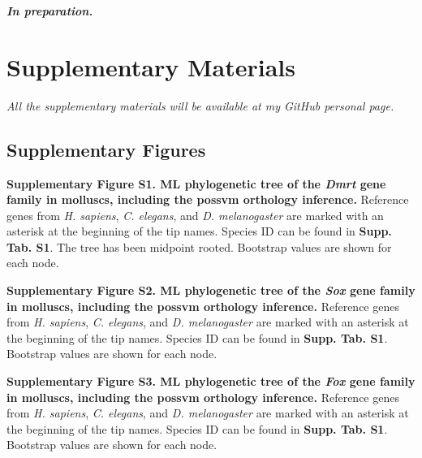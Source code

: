 \documentclass[../main.tex]{subfiles}
\begin{document}
\textbf{\textit{In preparation.}}

\section{Supplementary Materials} \label{chapter3_supp}

\textit{All the supplementary materials will be available at my GitHub personal page.}

\subsection*{Supplementary Figures}

\small{

    \textbf{Supplementary Figure S1. ML phylogenetic tree of the \textit{Dmrt} gene family in molluscs, including the possvm orthology inference.} Reference genes from \textit{H. sapiens}, \textit{C. elegans}, and \textit{D. melanogaster} are marked with an asterisk at the beginning of the tip names. Species ID can be found in \textbf{Supp. Tab. S1}. The tree has been midpoint rooted. Bootstrap values are shown for each node.

    \vspace{5mm}

    \noindent\textbf{Supplementary Figure S2. ML phylogenetic tree of the \textit{Sox} gene family in molluscs, including the possvm orthology inference.} Reference genes from \textit{H. sapiens}, \textit{C. elegans}, and \textit{D. melanogaster} are marked with an asterisk at the beginning of the tip names. Species ID can be found in \textbf{Supp. Tab. S1}. Bootstrap values are shown for each node.

    \vspace{5mm}

    \noindent\textbf{Supplementary Figure S3. ML phylogenetic tree of the \textit{Fox} gene family in molluscs, including the possvm orthology inference.} Reference genes from \textit{H. sapiens}, \textit{C. elegans}, and \textit{D. melanogaster} are marked with an asterisk at the beginning of the tip names. Species ID can be found in \textbf{Supp. Tab. S1}. Bootstrap values are shown for each node.
    
    \vspace{5mm}

}
\end{document}
